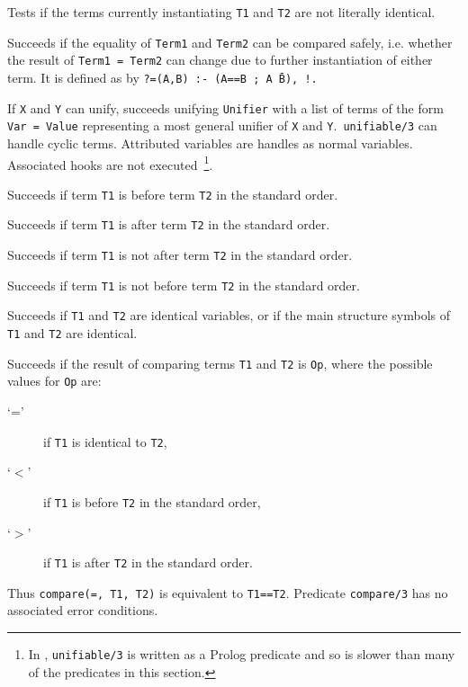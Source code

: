 \begin{description}
    Tests if the terms currently instantiating {\tt T1} and {\tt T2}
    are not literally identical.

%
Succeeds if the equality of {\tt Term1} and {\tt Term2} can be
compared safely, i.e. whether the result of {\tt Term1 = Term2} can
change due to further instantiation of either term. It is defined as
by {\tt ?=(A,B) :- (A==B ; A \= B), !.} 

%
If {\tt X} and {\tt Y} can unify, succeeds unifying {\tt Unifier} with
a list of terms of the form {\tt Var = Value} representing a most
general unifier of {\tt X} and {\tt Y}.\  {\tt unifiable/3} can handle
cyclic terms. Attributed variables are handles as normal
variables. Associated hooks are not executed~\footnote{In \version ,
  {\tt unifiable/3} is written as a Prolog predicate and so is slower
  than many of the predicates in this section.}.

    Succeeds if term {\tt T1} is before term {\tt T2} in the standard order.

    Succeeds if term {\tt T1} is after term {\tt T2} in the standard order.

    Succeeds if term {\tt T1} is not after term {\tt T2} in the standard order.

    Succeeds if term {\tt T1} is not before term {\tt T2} in the standard order.

    Succeeds if {\tt T1} and {\tt T2} are identical variables, or if
    the main structure symbols of {\tt T1} and {\tt T2} are identical.

    Succeeds if the result of comparing terms {\tt T1} and {\tt T2} 
    is {\tt Op}, where the possible values for {\tt Op} are:
    \begin{description}
    \item[`='] if {\tt T1} is identical to {\tt T2},
    \item[`$<$'] if {\tt T1} is before {\tt T2} in the standard order,
    \item[`$>$'] if {\tt T1} is after {\tt T2} in the standard order.
    \end{description}
    Thus {\tt compare(=, T1, T2)} is equivalent to {\tt T1==T2}.
    Predicate {\tt compare/3} has no associated error conditions.


\end{description}
